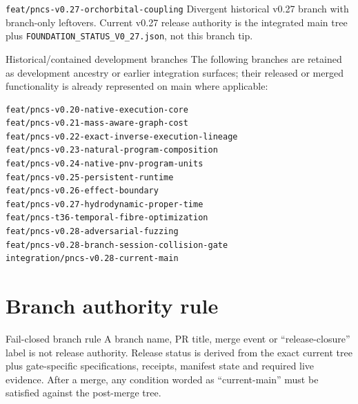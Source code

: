 \begin{statusbox}{\texttt{feat/pncs-v0.27-orchorbital-coupling}}
Divergent historical v0.27 branch with branch-only leftovers. Current v0.27 release authority is the integrated main tree plus \texttt{FOUNDATION\_STATUS\_V0\_27.json}, not this branch tip.
\end{statusbox}

\begin{statusbox}{Historical/contained development branches}
The following branches are retained as development ancestry or earlier integration surfaces; their released or merged functionality is already represented on main where applicable:
\begin{lstlisting}
feat/pncs-v0.20-native-execution-core
feat/pncs-v0.21-mass-aware-graph-cost
feat/pncs-v0.22-exact-inverse-execution-lineage
feat/pncs-v0.23-natural-program-composition
feat/pncs-v0.24-native-pnv-program-units
feat/pncs-v0.25-persistent-runtime
feat/pncs-v0.26-effect-boundary
feat/pncs-v0.27-hydrodynamic-proper-time
feat/pncs-t36-temporal-fibre-optimization
feat/pncs-v0.28-adversarial-fuzzing
feat/pncs-v0.28-branch-session-collision-gate
integration/pncs-v0.28-current-main
\end{lstlisting}
\end{statusbox}

\section{Branch authority rule}
\begin{statusbox}{Fail-closed branch rule}
A branch name, PR title, merge event or ``release-closure'' label is not release authority. Release status is derived from the exact current tree plus gate-specific specifications, receipts, manifest state and required live evidence. After a merge, any condition worded as ``current-main'' must be satisfied against the post-merge tree.
\end{statusbox}
